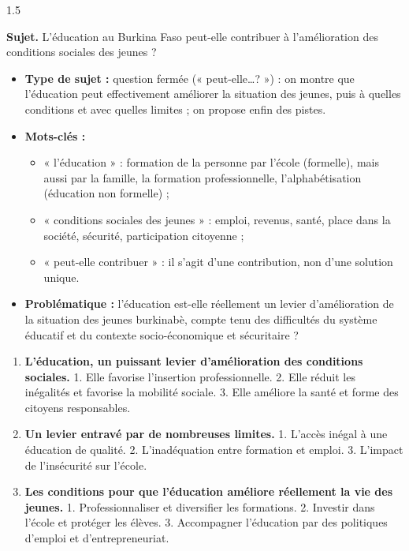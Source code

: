 \documentclass[12pt]{article}
\begin{document}
\begin{spacing}{1.5}

\noindent\textbf{Sujet.} L'éducation au Burkina Faso peut-elle contribuer à l'amélioration des conditions sociales des jeunes ?


\begin{itemize}
\item \textbf{Type de sujet :} question fermée (« peut-elle\dots ? ») : on montre que l'éducation peut effectivement améliorer la situation des jeunes, puis à quelles conditions et avec quelles limites ; on propose enfin des pistes.
\item \textbf{Mots-clés :}
  \begin{itemize}
  \item « l'éducation » : formation de la personne par l'école (formelle), mais aussi par la famille, la formation professionnelle, l'alphabétisation (éducation non formelle) ;
  \item « conditions sociales des jeunes » : emploi, revenus, santé, place dans la société, sécurité, participation citoyenne ;
  \item « peut-elle contribuer » : il s'agit d'une contribution, non d'une solution unique.
  \end{itemize}
\item \textbf{Problématique :} l'éducation est-elle réellement un levier d'amélioration de la situation des jeunes burkinabè, compte tenu des difficultés du système éducatif et du contexte socio-économique et sécuritaire ?
\end{itemize}


\begin{enumerate}
\item[I.] \textbf{L'éducation, un puissant levier d'amélioration des conditions sociales.} 1. Elle favorise l'insertion professionnelle. 2. Elle réduit les inégalités et favorise la mobilité sociale. 3. Elle améliore la santé et forme des citoyens responsables.
\item[II.] \textbf{Un levier entravé par de nombreuses limites.} 1. L'accès inégal à une éducation de qualité. 2. L'inadéquation entre formation et emploi. 3. L'impact de l'insécurité sur l'école.
\item[III.] \textbf{Les conditions pour que l'éducation améliore réellement la vie des jeunes.} 1. Professionnaliser et diversifier les formations. 2. Investir dans l'école et protéger les élèves. 3. Accompagner l'éducation par des politiques d'emploi et d'entrepreneuriat.
\end{enumerate}


\end{spacing}
\end{document}
